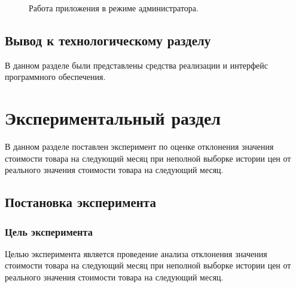 \documentclass[a4paper,14pt]{extreport}
\begin{document}
\begin{figure}[H]
	\centering
	\caption{Работа приложения в режиме администратора.}
	\label{ui3}
\end{figure}

\section*{Вывод к технологическому разделу}

В данном разделе были представлены средства реализации и интерфейс программного обеспечения.

\chapter{Экспериментальный \newline раздел}

В данном разделе поставлен эксперимент по оценке отклонения значения стоимости товара на следующий месяц при неполной выборке истории цен от реального значения стоимости товара на следующий месяц.

\section{Постановка эксперимента}

\subsection{Цель эксперимента}

Целью эксперимента является проведение анализа отклонения значения стоимости товара на следующий месяц при неполной выборке истории цен от реального значения стоимости товара на следующий месяц.
\end{document}
